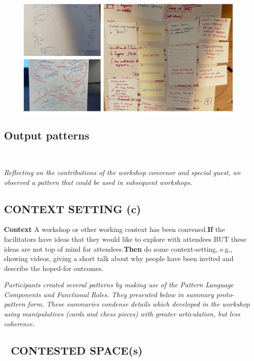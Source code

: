 \documentclass[acmlarge,timestamp]{acmart}
\newcommand{\sensory}{(s)}
\newcommand{\cognitive}{(c)}
\begin{document}
\begin{figure}
  \includegraphics[width=\textwidth]{PatternProcess.png}
  \caption{\label{ExampleParticipantPattern}}
\end{figure}

\clearpage 

\subsection{Output patterns} ~
\smallskip

\noindent \emph{Reflecting on the contributions of the workshop
convenor and special guest, we observed a pattern that could be used
in subsequent workshops.}

\subsection*{CONTEXT SETTING {\hfill \cognitive}}
\textbf{Context} A workshop or other working context has been
convened.\newline \textbf{If} the facilitators have ideas that they
would like to explore with attendees BUT these ideas are not top of
mind for attendees.\newline \textbf{Then} do some context-setting,
e.g., showing videos, giving a short talk about why people have been
invited and describe the hoped-for outcomes.

\smallskip

\noindent \emph{Participants created several patterns by making use of
the {\sc Pattern Language Components} and {\sc Functional Roles}.
They presented below in summary proto-pattern form.  These summaries
condense details which developed in the workshop using manipulatives
(cards and chess pieces) with greater articulation, but less
coherence.}


\subsection*{💎 CONTESTED SPACE{\hfill \sensory}}\label{pat:contested-space}
\end{document}
